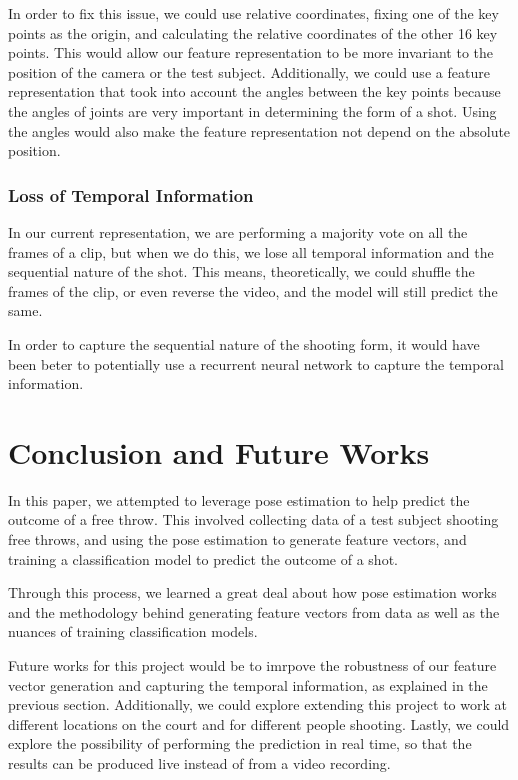\documentclass[10pt,twocolumn,letterpaper]{article}
\begin{document}
In order to fix this issue, we could use relative coordinates, fixing one of the key points as the origin, and calculating the relative coordinates of the other 16 key points.
This would allow our feature representation to be more invariant to the position of the camera or the test subject. Additionally, we could use a feature representation that took into
account the angles between the key points because the angles of joints are very important in determining the form of a shot. Using the angles would also make the feature representation
not depend on the absolute position.

\subsubsection{Loss of Temporal Information}

In our current representation, we are performing a majority vote on all the frames of a clip, but when we do this, we lose all temporal information and the sequential nature of the shot.
This means, theoretically, we could shuffle the frames of the clip, or even reverse the video, and the model will still predict the same. 

In order to capture the sequential
nature of the shooting form, it would have been beter to potentially use a recurrent neural network to capture the temporal information. 

\section{Conclusion and Future Works}
In this paper, we attempted to leverage pose estimation to help predict the outcome of a free throw. This involved collecting data
of a test subject shooting free throws, and using the pose estimation to generate feature vectors, and training a 
classification model to predict the outcome of a shot.

Through this process, we learned a great deal about how pose estimation works and the methodology behind generating feature vectors from data as well as
the nuances of training classification models.

Future works for this project would be to imrpove the robustness of our feature vector generation and capturing the temporal information, as explained 
in the previous section. Additionally, we could explore extending this project to work at different locations on the court and for different people shooting.
Lastly, we could explore the possibility of performing the prediction in real time, so that the results can be produced live instead of from a video recording.




{\small


}
\end{document}
